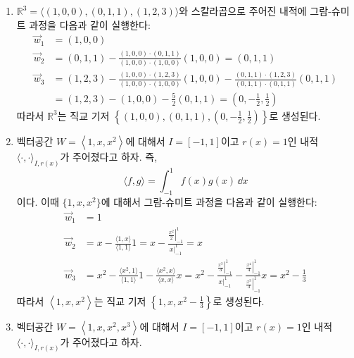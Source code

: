 \documentclass[../engineering_mathematics_lecture_note.tex]{subfiles}
\begin{document}
\begin{example}
    \leavevmode
    \begin{enumerate}
        \item $\mathbb R^3 = \langle (1, 0, 0), (0, 1, 1), (1, 2, 3) \rangle$와 스칼라곱으로 주어진 내적에 그람-슈미트 과정을 다음과 같이 실행한다:
            \begin{align*}
                \vec w_1 &= (1, 0, 0)\\
                \vec w_2 &= (0, 1, 1) - \frac{(1, 0, 0) \cdot (0, 1, 1)}{(1, 0, 0) \cdot (1, 0, 0)} (1, 0, 0) = (0, 1, 1)\\
                \vec w_3 &= (1, 2, 3) - \frac{(1, 0, 0) \cdot (1, 2, 3)}{(1, 0, 0) \cdot (1, 0, 0)}(1, 0, 0) - \frac{(0, 1, 1) \cdot (1, 2, 3)}{(0, 1, 1) \cdot (0, 1, 1)}(0, 1, 1)\\
                         &= (1, 2, 3) - (1, 0, 0) - \frac 52 (0, 1, 1) = \left(0, -\frac 12, \frac 12\right)
            \end{align*}
            따라서 $\mathbb R^3$는 직교 기저 $\left\{(1, 0, 0), (0, 1, 1), \left(0, -\frac12, \frac12\right)\right\}$로 생성된다.
        \item 벡터공간 $W = \left< 1, x, x^2 \right>$에 대해서 $I = [-1, 1]$이고 $r(x) = 1$인 내적 $\langle \cdot, \cdot \rangle_{I, r(x)}$가 주어졌다고 하자.
            즉,
            \begin{equation*}
                \langle f, g \rangle = \int_{-1}^1 f(x) g(x)\,\dd x
            \end{equation*}
            이다.
            이때 $\{1, x, x^2\}$에 대해서 그람-슈미트 과정을 다음과 같이 실행한다:
            \begin{align*}
                \vec w_1 &= 1\\
                \vec w_2 &= x - \frac{\langle 1, x \rangle}{\langle 1, 1\rangle} 1 = x - \frac{\left. \frac{x^2}{2}\right|_{-1}^1}{\left. x\right|_{-1}^1} = x\\
                \vec w_3 &= x^2 - \frac{\langle x^2, 1 \rangle}{\langle 1, 1\rangle} 1 - \frac{\langle x^2, x\rangle}{\langle x, x \rangle} x = x^2 - \frac{\left.\frac{x^3}{3}\right|_{-1}^1}{\left. x \right|_{-1}^1} - \frac{\left. \frac{x^4}{4} \right|_{-1}^1}{\left. \frac{x^3}{3} \right|_{-1}^1} x = x^2 - \frac13
            \end{align*}
            따라서 $\left< 1, x, x^2 \right>$는 직교 기저 $\left\{1, x, x^2 - \frac13\right\}$로 생성된다.
        \item 벡터공간 $W = \left< 1, x, x^2, x^3 \right>$에 대해서 $I = [-1, 1]$이고 $r(x) = 1$인 내적 $\langle \cdot, \cdot \rangle_{I, r(x)}$가 주어졌다고 하자.

\end{enumerate}
\end{example}
\end{document}
